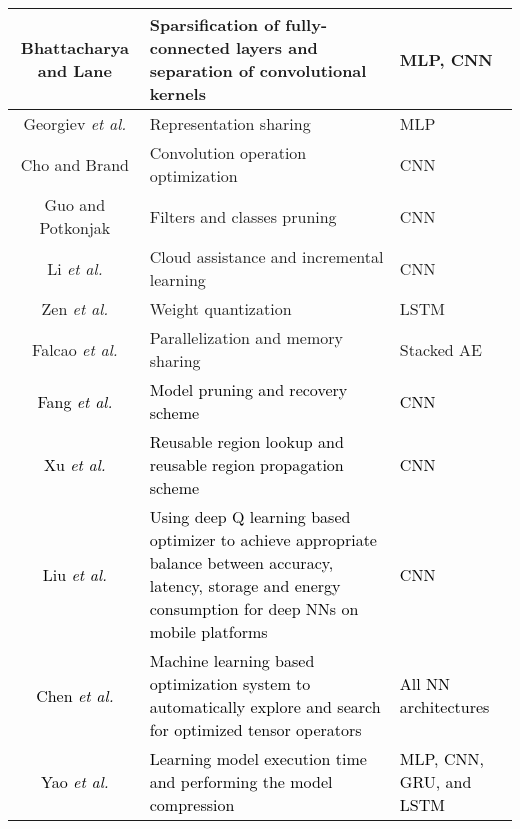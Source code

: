 \documentclass[journal,comsoc,letter]{IEEEtran}
\newcommand{\rev}[1]{\textcolor{black}{#1}}
\begin{document}
\begin{table*}[htb]
\begin{tabular}{|c|C{11.5cm}|C{2cm}|}
Bhattacharya and Lane \cite{bhattacharya2016sparsification} & Sparsification of fully-connected layers and separation of convolutional kernels & MLP, CNN              \\ \hline
Georgiev \emph{et al.} \cite{georgiev2017low}               & Representation sharing                                                           & MLP                   \\ \hline
Cho and Brand \cite{cho2017mec}                             & Convolution operation optimization                                               & CNN                   \\ \hline
Guo and Potkonjak \cite{guo2017pruning}                     & Filters and classes pruning                                                      & CNN                   \\ \hline
Li \emph{et al.} \cite{li2017fitcnn}                        & Cloud assistance and incremental learning                                        & CNN                   \\ \hline
Zen \emph{et al.} \cite{zen2016fast}                        & Weight quantization                                                              & LSTM                  \\ \hline
Falcao \emph{et al.} \cite{falcao2017evaluation}            & Parallelization and memory sharing                                               & Stacked AE            \\ \hline
\rev{Fang \emph{et al.} \cite{fang2018nestdnn}}            & \rev{Model pruning and recovery
scheme   }                                            & \rev{CNN}           \\ \hline
\rev{Xu \emph{et al.} \cite{xu2018deepcache}}            & \rev{Reusable region lookup and reusable region propagation scheme}
                                               & \rev{CNN}           \\ \hline
\rev{Liu \emph{et al.} \cite{liu2018ondemand}}            & \rev{Using deep Q learning based optimizer to achieve appropriate balance between accuracy, latency, storage and energy consumption for deep NNs on mobile platforms}
                                               & \rev{CNN}           \\ \hline 
\rev{Chen \emph{et al.} \cite{chen2018tvm}}            & \rev{Machine learning based optimization system to  automatically explore and search for optimized tensor operators}
                                               & \rev{All NN architectures}           \\ \hline
\rev{Yao \emph{et al.} \cite{yao2018fastdeepiot}}            & \rev{Learning model execution time and performing the model compression}
                                               & \rev{MLP, CNN, GRU, and LSTM}           \\ \hline                                               
\end{tabular}
\end{table*}
\end{document}
